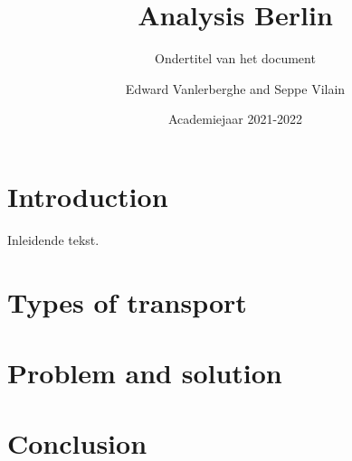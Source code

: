 \documentclass[a4paper,twoside,kul]{kulakreport} %
\title{Analysis Berlin}
\subtitle{Ondertitel van het document}
\author{Edward Vanlerberghe and Seppe Vilain}
\institute{KU Leuven}
\date{Academiejaar 2021-2022}
\begin{document}

\titlepage

\tableofcontents

\chapter*{Introduction}
Inleidende tekst.


\chapter{Types of transport}

	
	
\chapter{Problem and solution}



\chapter*{Conclusion}
\nocite{dlr76743}


\end{document}
